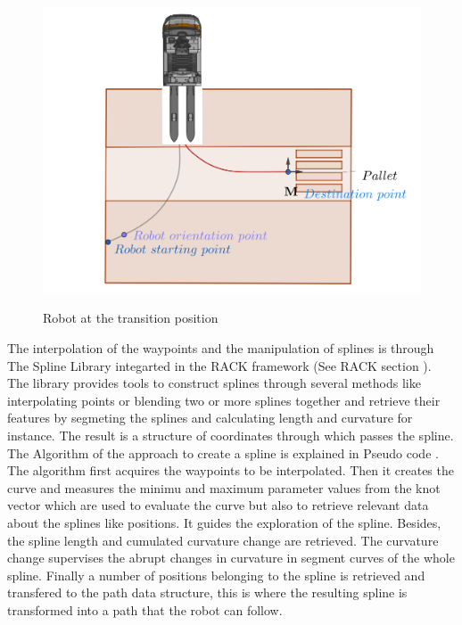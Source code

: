 \begin{figure}[H]
    \begin{center}
        \includegraphics[width=5in]{images/Chap2/truck_transition.png}\\
        \caption{Robot at the transition position}
        \label{transition}
        \end{center}    
\end{figure}

The interpolation of the waypoints and the manipulation of splines is through The Spline Library integarted in 
the RACK framework (See RACK section%
). The library provides tools to construct splines through several methods like interpolating points or blending two or more splines 
together and retrieve their features by segmeting the splines and calculating length and curvature for instance.
The result is a structure of coordinates through which passes the spline. 
The Algorithm of the approach to create a spline is explained in Pseudo code .
The algorithm first acquires the waypoints to be interpolated. Then it creates the curve 
and measures the minimu and maximum parameter values from the knot vector which are used to evaluate 
the curve but also to retrieve relevant data about the splines like positions. It guides the exploration
of the spline. Besides, the spline length and cumulated curvature change are retrieved. 
The curvature change supervises the abrupt changes in curvature in segment curves of the whole spline.
Finally a number of positions belonging to the spline is retrieved and transfered to the path data structure,
this is where the resulting spline is transformed into a path that the robot can follow.

